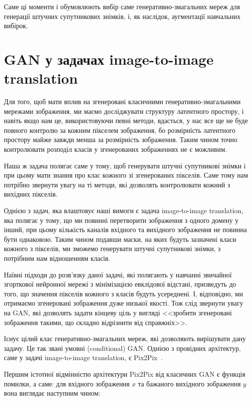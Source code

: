 Саме ці моменти і обумовлюють вибір саме генеративно-змагальних
мереж для генерації штучних супутникових знімків, і, як наслідок,
аугментації навчальних вибірок.

\section{GAN у задачах image-to-image translation}

Для того, щоб мати вплив на згенеровані класичними
генеративно-змагальними мережами зображення, ми маємо
досліджувати структуру латентного простору, і навіть якщо нам
це, використовуючи певні методи, вдасться, у нас все ще не буде
повного контролю за кожним пікселем зображення, бо
розмірність латентного простору майже завжди менша за
розмірність зображення. Таким чином точно контролювати розподіл класів у
згенерованих зображеннях не є можливим.

Наша ж задача полягає саме у тому, щоб генерувати штучні супутникові
знімки і при цьому мати знання про клас кожного зі згенерованих
пікселів. Саме тому нам потрібно звернути увагу на ті методи, які дозволять
контролювати кожний з вихідних пікселів.

Однією з задач, яка влаштовує наші вимоги є задача image-to-image translation,
яка полягає у тому, що ми повинні перетворити зображення з одного домену у інший, при цьому кількість
каналів вхідного та вихідного зображення не повинна бути однаковою.
Таким чином подавши маски, на яких будуть зазначені класи кожного з пікселів,
ми зможемо генерувати штучні супутникові знімки, з потрібним нам
відношенням класів.

Наївні підходи до розв'язку даної задачі, які полягають у навчанні
звичайної згорткової нейронної мережі з мінімізацією евклідової відстані,
призведуть до того, що значення пікселів кожного з класів будуть
усереднені. І, відповідно, ми отримаємо згенеровані зображення
дуже низької якості. Тож слід звернути увагу на GAN, які дозволять
задати кінцеву ціль у вигляді <<зробити згенеровані
зображення такими, що складно відрізнити від справжніх>>.

Існує цілий клас генеративно-змагальних мереж, які дозволяють вирішувати дану
задачу. Це так звані умовні (conditional) GAN. Однією з провідних
архітектур, саме у задачі image-to-image translation, є Pix2Pix~\cite{pix2pix}.

Першим істотної відмінністю архітектури Pix2Pix від
класичних GAN є функція помилки, а саме: для вхідного зображення
$x$ та бажаного вихідного зображення $y$ вона виглядає
наступним чином:

